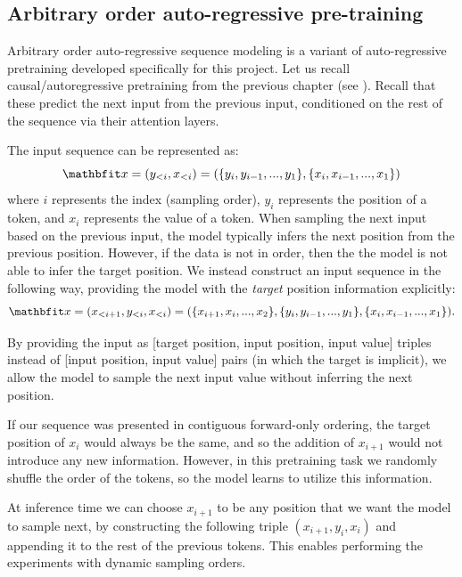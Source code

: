 \subsection{Arbitrary order auto-regressive pre-training}
\label{sss:pretraining-triples}

Arbitrary order auto-regressive sequence modeling is a variant of auto-regressive pretraining developed specifically for this project. Let us recall causal/autoregressive pretraining from the previous chapter (see ). Recall that these predict the next input from the previous input, conditioned on the rest of the sequence via their attention layers.

The input sequence can be represented as:
\begin{equation*}
   \x = (y_{<i}, x_{<i}) = ( \{ y_i, y_{i-1}, ..., y_1 \}, \{ x_i, x_{i-1}, ..., x_1 \} )
\end{equation*}
where $i$ represents the index (sampling order), $y_i$ represents the position of a token, and $x_i$ represents the value of a token. When sampling the next input based on the previous input, the model typically infers the next position from the previous position. However, if the data is not in order, then the the model is not able to infer the target position. We instead construct an input sequence in the following way, providing the model with the \textit{target} position information explicitly:
\begin{equation*}
   \x = (x_{<i+1}, y_{<i}, x_{<i}) = ( \{ x_{i+1}, x_{i}, ..., x_2 \}, \{ y_i, y_{i-1}, ..., y_1 \}, \{ x_i, x_{i-1}, ..., x_1 \} ).
\end{equation*}

By providing the input as [target position, input position, input value] triples instead of [input position, input value] pairs (in which the target is implicit), we allow the model to sample the next input value without inferring the next position.

If our sequence was presented in contiguous forward-only ordering, the target position of $x_i$ would always be the same, and so the addition of $x_{i+1}$ would not introduce any new information. However, in this pretraining task we randomly shuffle the order of the tokens, so the model learns to utilize this information.

At inference time we can choose $x_{i+1}$ to be any position that we want the model to sample next, by constructing the following triple $(x_{i+1}, y_i, x_i)$ and appending it to the rest of the previous tokens. This enables performing the experiments with dynamic sampling orders.

